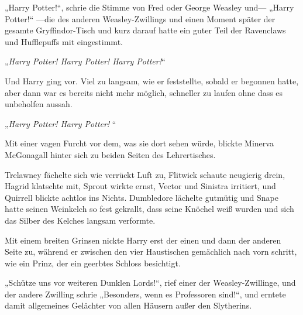„Harry Potter!“, schrie die Stimme von Fred oder George Weasley und— „Harry Potter!“ —die des anderen Weasley-Zwillings und einen Moment später der gesamte Gryffindor-Tisch und kurz darauf hatte ein guter Teil der Ravenclaws und Hufflepuffs mit eingestimmt.

„\emph{Harry Potter! Harry Potter! Harry Potter!}“

Und Harry ging vor. Viel zu langsam, wie er feststellte, sobald er begonnen hatte, aber dann war es bereits nicht mehr möglich, schneller zu laufen ohne dass es unbeholfen aussah.

\later

„\emph{Harry Potter! Harry Potter! }“


Mit einer vagen Furcht vor dem, was sie dort sehen würde, blickte Minerva McGonagall hinter sich zu beiden Seiten des Lehrertisches.

Trelawney fächelte sich wie verrückt Luft zu, Flitwick schaute neugierig drein, Hagrid klatschte mit, Sprout wirkte ernst, Vector und Sinistra irritiert, und Quirrell blickte achtlos ins Nichts. Dumbledore lächelte gutmütig und Snape hatte seinen Weinkelch so fest gekrallt, dass seine Knöchel weiß wurden und sich das Silber des Kelches langsam verformte.

Mit einem breiten Grinsen nickte Harry erst der einen und dann der anderen Seite zu, während er zwischen den vier Haustischen gemächlich nach vorn schritt, wie ein Prinz, der ein geerbtes Schloss besichtigt.

„Schütze uns vor weiteren Dunklen Lords!“, rief einer der Weasley-Zwillinge, und der andere Zwilling schrie „Besonders, wenn es Professoren sind!“, und erntete damit allgemeines Gelächter von allen Häusern außer den Slytherins.

